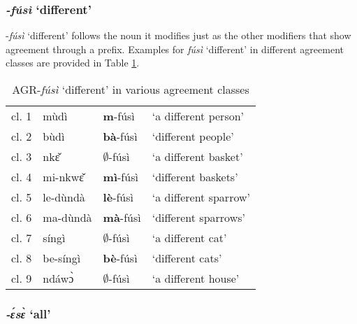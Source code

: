 \subsubsection{{\itshape -fúsì} `different'} 
-{\itshape fúsì} `different' follows the noun it modifies just as the other modifiers that show agreement through a prefix.  Examples for {\itshape fúsì} `different' in different agreement classes are provided in Table \ref{Tab:different}.

\begin{table} 
\centering
\begin{tabular}{llll}
 \midrule
cl. 1 & mùdì & {\bfseries m}-fúsì  & `a different person' \\
cl. 2 & bùdì & {\bfseries bà}-fúsì & `different people' \\
cl. 3 & nkɛ̌ & {\bfseries $\emptyset$}-fúsì & `a different basket' \\
cl. 4 & mi-nkwɛ̌ & {\bfseries mì}-fúsì & `different baskets' \\
cl. 5 & le-dùndà & {\bfseries lè}-fúsì & `a different sparrow' \\
cl. 6 & ma-dùndà & {\bfseries mà}-fúsì &  `different sparrows' \\
cl. 7 & síngì & {\bfseries $\emptyset$}-fúsì & `a different cat' \\
cl. 8 & be-síngì & {\bfseries bè}-fúsì & `different cats' \\
cl. 9 & ndáwɔ̀ & {\bfseries $\emptyset$}-fúsì & `a different house' \\
 \midrule
\end{tabular}
\caption{AGR-{\itshape fúsì} `different' in various agreement classes}
\label{Tab:different}
\end{table}







\subsubsection{{\itshape -ɛ́sɛ̀} `all'} 
\label{sec:ModAll}


